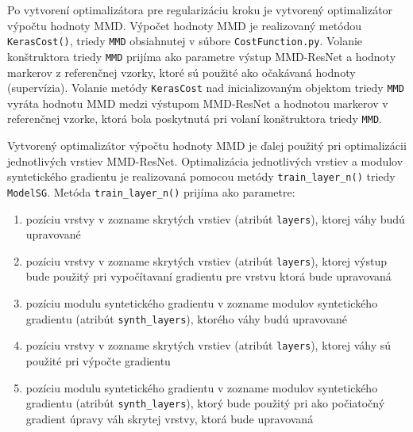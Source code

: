 Po vytvorení optimalizátora pre regularizáciu kroku je vytvorený optimalizátor výpočtu hodnoty MMD. Výpočet hodnoty MMD je realizovaný metódou \texttt{KerasCost()}, triedy \texttt{MMD} obsiahnutej v súbore \texttt{CostFunction.py}. Volanie konštruktora triedy \texttt{MMD} prijíma ako parametre výstup MMD-ResNet a hodnoty markerov z referenčnej vzorky, ktoré sú použité ako očakávaná hodnoty (supervízia). Volanie metódy \texttt{KerasCost} nad inicializovaným objektom triedy \texttt{MMD} vyráta hodnotu MMD medzi výstupom MMD-ResNet a hodnotou markerov v referenčnej vzorke, ktorá bola poskytnutá pri volaní konštruktora triedy \texttt{MMD}.

Vytvorený optimalizátor výpočtu hodnoty MMD je ďalej použitý pri optimalizácii jednotlivých vrstiev MMD-ResNet. Optimalizácia jednotlivých vrstiev a modulov syntetického gradientu  je realizovaná pomocou metódy \texttt{train_layer_n()} triedy \texttt{ModelSG}. Metóda \texttt{train_layer_n()} prijíma ako parametre:
\begin{enumerate}
    \item pozíciu vrstvy v zozname skrytých vrstiev (atribút \texttt{layers}), ktorej váhy budú upravované 
    \item pozíciu vrstvy v zozname skrytých vrstiev (atribút \texttt{layers}), ktorej výstup bude použitý pri vypočítavaní gradientu pre vrstvu ktorá bude upravovaná
    \item pozíciu modulu syntetického gradientu v zozname modulov syntetického gradientu (atribút \texttt{synth_layers}), ktorého váhy budú upravované
    \item pozíciu vrstvy v zozname skrytých vrstiev (atribút \texttt{layers}), ktorej váhy sú použité pri výpočte gradientu
    \item pozíciu modulu syntetického gradientu v zozname modulov syntetického gradientu (atribút \texttt{synth_layers}), ktorý bude použitý pri ako počiatočný gradient úpravy váh skrytej vrstvy, ktorá bude upravovaná
\end{enumerate}
